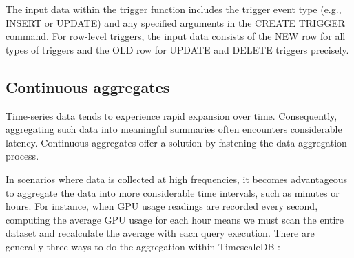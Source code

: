 The input data within the trigger function includes the trigger event type (e.g., INSERT or UPDATE) and any specified arguments in the CREATE TRIGGER command. For row-level triggers, the input data consists of the NEW row for all types of triggers and the OLD row for UPDATE and DELETE triggers precisely.

\subsection{Continuous aggregates}


Time-series data tends to experience rapid expansion over time. Consequently, aggregating such data into meaningful summaries often encounters considerable latency. Continuous aggregates \cite{10.14778/3611540.3611559} offer a solution by fastening the data aggregation process.

In scenarios where data is collected at high frequencies, it becomes advantageous to aggregate the data into more considerable time intervals, such as minutes or hours. For instance, when GPU usage readings are recorded every second, computing the average GPU usage for each hour means we must scan the entire dataset and recalculate the average with each query execution. There are generally three ways to do the aggregation within TimescaleDB \cite{ConAggs}:

